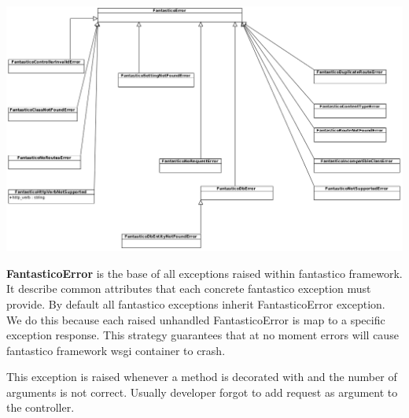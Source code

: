 \documentclass[letterpaper,10pt,english]{sphinxmanual}
\begin{document}
\begin{fulllineitems}
\label{features/exceptions:fantastico.exceptions.FantasticoError}~
\includegraphics{exceptions.png}

\textbf{FantasticoError} is the base of all exceptions raised within fantastico framework. It describe common attributes that
each concrete fantastico exception must provide. By default all fantastico exceptions inherit FantasticoError exception. 
We do this because each raised unhandled FantasticoError is map to a specific exception response. This strategy guarantees
that at no moment errors will cause fantastico framework wsgi container to crash.

\end{fulllineitems}


\begin{fulllineitems}
\label{features/exceptions:fantastico.exceptions.FantasticoControllerInvalidError}
This exception is raised whenever a method is decorated with 
{\hyperref[features/mvc:fantastico.mvc.controller_decorators.Controller]{}} and the number of arguments is not correct. Usually
developer forgot to add request as argument to the controller.

\end{fulllineitems}

\end{document}
